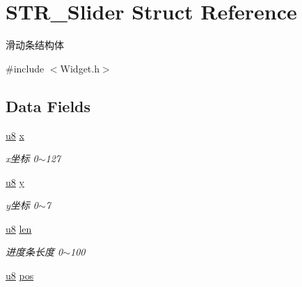 \hypertarget{struct_s_t_r___slider}{\section{\-S\-T\-R\-\_\-\-Slider \-Struct \-Reference}
\label{struct_s_t_r___slider}
}


滑动条结构体  




{\ttfamily \#include $<$\-Widget.\-h$>$}

\subsection*{\-Data \-Fields}
\begin{DoxyCompactItemize}
\item 
\hypertarget{struct_s_t_r___slider_a66ab7498cbcfba822aa9a2891beffae2}{\hyperlink{group___b_s_p_gaed742c436da53c1080638ce6ef7d13de}{u8} \hyperlink{struct_s_t_r___slider_a66ab7498cbcfba822aa9a2891beffae2}{x}}\label{struct_s_t_r___slider_a66ab7498cbcfba822aa9a2891beffae2}

\begin{DoxyCompactList}\small\item\em x坐标 0$\sim$127 \end{DoxyCompactList}\item 
\hypertarget{struct_s_t_r___slider_ad87f9078b74ef74a58041131d06283c2}{\hyperlink{group___b_s_p_gaed742c436da53c1080638ce6ef7d13de}{u8} \hyperlink{struct_s_t_r___slider_ad87f9078b74ef74a58041131d06283c2}{y}}\label{struct_s_t_r___slider_ad87f9078b74ef74a58041131d06283c2}

\begin{DoxyCompactList}\small\item\em y坐标 0$\sim$7 \end{DoxyCompactList}\item 
\hypertarget{struct_s_t_r___slider_afbf3f3230446569534d5f466aaf4c23b}{\hyperlink{group___b_s_p_gaed742c436da53c1080638ce6ef7d13de}{u8} \hyperlink{struct_s_t_r___slider_afbf3f3230446569534d5f466aaf4c23b}{len}}\label{struct_s_t_r___slider_afbf3f3230446569534d5f466aaf4c23b}

\begin{DoxyCompactList}\small\item\em 进度条长度 0$\sim$100 \end{DoxyCompactList}\item 
\hypertarget{struct_s_t_r___slider_aac27b711cb5c70694c86b54ecc15a545}{\hyperlink{group___b_s_p_gaed742c436da53c1080638ce6ef7d13de}{u8} \hyperlink{struct_s_t_r___slider_aac27b711cb5c70694c86b54ecc15a545}{pos}}\label{struct_s_t_r___slider_aac27b711cb5c70694c86b54ecc15a545}


\end{DoxyCompactItemize}
